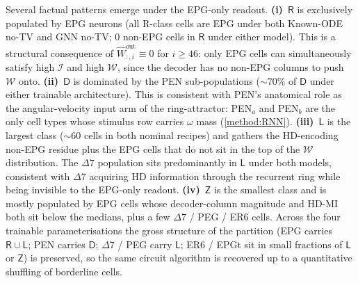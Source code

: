 \documentclass[11pt]{article}
\newcommand{\mi}{\mathcal{I}}
\newcommand{\omag}{\mathcal{W}}
\newcommand{\omod}{\mathcal{O}}
\newcommand{\cls}[1]{\mathsf{#1}}
\begin{document}
Several factual patterns emerge under the EPG-only readout.
\textbf{(i)}~$\cls{R}$ is exclusively populated by EPG neurons
(all R-class cells are EPG under both Known-ODE no-TV and GNN
no-TV; $0$ non-EPG cells in $\cls{R}$ under either model). This
is a structural consequence of $\hat W^{\mathrm{out}}_{:,i}
\equiv 0$ for $i \ge 46$: only EPG cells can simultaneously
satisfy high $\mi$ and high $\omag$, since the decoder has no
non-EPG columns to push $\omag$ onto.
\textbf{(ii)}~$\cls{D}$ is dominated by the PEN sub-populations
($\sim 70\%$ of $\cls{D}$ under either trainable architecture).
This is consistent with PEN's anatomical role as the
angular-velocity input arm of the ring-attractor: PEN$_a$ and
PEN$_b$ are the only cell types whose stimulus row carries
$\omega$ mass (\cref{method:RNN}).
\textbf{(iii)}~$\cls{L}$ is the largest class ($\sim\!60$ cells
in both nominal recipes) and gathers the HD-encoding non-EPG
residue plus the EPG cells that do not sit in the top of the
$\omag$ distribution. The $\Delta 7$ population sits predominantly
in $\cls{L}$ under both models, consistent with $\Delta 7$
acquiring HD information through the recurrent ring while being
invisible to the EPG-only readout.
\textbf{(iv)}~$\cls{Z}$ is the smallest class and is mostly
populated by EPG cells whose decoder-column magnitude and HD-MI
both sit below the medians, plus a few $\Delta 7$ / PEG / ER6
cells. Across the four trainable parameterisations the gross
structure of the partition (EPG carries $\cls{R}\cup\cls{L}$;
PEN carries $\cls{D}$; $\Delta 7$ / PEG carry $\cls{L}$; ER6 /
EPGt sit in small fractions of $\cls{L}$ or $\cls{Z}$) is
preserved, so the same circuit algorithm is recovered up to a
quantitative shuffling of borderline cells.

\begin{table}[H]
  \centering
  \small
  \caption{\textbf{Per-cell-type breakdown across the four
  functional classes} for the two nominal no-TV recipes (Known-ODE
  no-TV and GNN no-TV), one representative training fold each.
  Class definitions: $\cls{R}$ high-MI \& high $\omag$, $\cls{L}$
  high-MI \& low $\omag$, $\cls{D}$ low-MI \& high $\omod$,
  $\cls{Z}$ low-MI \& low $\omod$; thresholds set at the sample
  median (taken over the non-zero $\omag$ entries for the $\omag$
  threshold). Class names follow the convention of the zebrafish
  HD-circuit partition \citep{petrucco2023}.}
  \label{tab:cx_four_classes}
  
\end{table}
\end{document}
